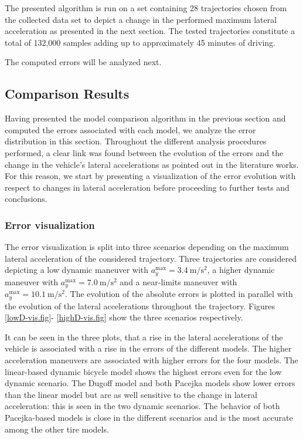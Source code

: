 \documentclass[journal]{IEEEtran}
\begin{document}
The presented algorithm is run on a set containing 28 trajectories chosen from the collected data set to depict a change in the performed maximum lateral acceleration as presented in the next section. The tested trajectories constitute a total of 132,000 samples adding up to approximately 45 minutes of driving.

The computed errors will be analyzed next. 

\subsection{Comparison Results}\label{comparisonRes.ssec}
Having presented the model comparison algorithm in the previous section and computed the errors associated with each model, we analyze the error distribution in this section. Throughout the different analysis procedures performed, a clear link was found between the evolution of the errors and the change in the vehicle's lateral accelerations as pointed out in the literature works. For this reason, we start by presenting a visualization of the error evolution with respect to changes in lateral acceleration before proceeding to further tests and conclusions.

\subsubsection{Error visualization}
The error visualization is split into three scenarios depending on the maximum lateral acceleration of the considered trajectory. Three trajectories are considered depicting a low dynamic maneuver with $a_y^{\text{max}} = \SI{3.4}{\meter\per\second\squared}$, a higher dynamic maneuver with $a_y^{\text{max}} = \SI{7.0}{\meter\per\second\squared}$ and a near-limits maneuver with $a_y^{\text{max}} = \SI{10.1}{\meter\per\second\squared}$. The evolution of the absolute errors is plotted in parallel with the evolution of the lateral accelerations throughout the trajectory. Figures \ref{lowD-vis.fig}- \ref{highD-vis.fig} show the three scenarios respectively.

It can be seen in the three plots, that a rise in the lateral accelerations of the vehicle is associated with a rise in the errors of the different models. The higher acceleration maneuvers are associated with higher errors for the four models. The linear-based dynamic bicycle model shows the highest errors even for the low dynamic scenario. The Dugoff model and both Pacejka models show lower errors than the linear model but are as well sensitive to the change in lateral acceleration: this is seen in the two dynamic scenarios. The behavior of both Pacejka-based models is close in the different scenarios and is the most accurate among the other tire models.
\end{document}
